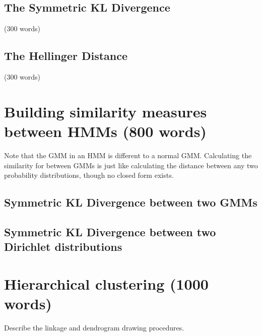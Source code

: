 \documentclass[../main.tex]{subfiles}
\begin{document}
\subsection{The Symmetric KL Divergence} (300 words)
\subsection{The Hellinger Distance} (300 words)
\section{ Building similarity measures between HMMs (800 words) } 
Note that the GMM in an HMM is different to a normal GMM. Calculating the similarity for between GMMs is just like calculating the distance between any two probability distributions, though no closed form exists. 
\subsection{Symmetric KL Divergence between two GMMs}
\subsection{Symmetric KL Divergence between two Dirichlet distributions}
\section{ Hierarchical clustering (1000 words)} 
Describe the linkage and dendrogram drawing procedures.
\end{document}
